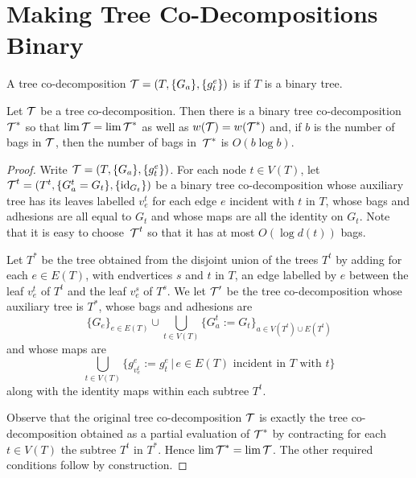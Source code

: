 
\section{Making Tree Co-Decompositions Binary}\label{appendix:binary}

\begin{definition}
    A tree co-decomposition $\operatorname{\mathcal{T}}=(T,\{G_a\},\{g_t^e\})$ is  if $T$ is a binary tree.
\end{definition}

\begin{lemma}
    Let $\operatorname{\mathcal{T}}$ be a tree co-decomposition. Then there is a binary tree co-decomposition $\operatorname{\mathcal{T}}^*$ so that $\lim \operatorname{\mathcal{T}}=\lim\operatorname{\mathcal{T}}^*$ as well as $w(\operatorname{\mathcal{T}})=w(\operatorname{\mathcal{T}}^*)$ and, if $b$ is the number of bags in $\operatorname{\mathcal{T}}$, then the number of bags in~$\operatorname{\mathcal{T}}^*$ is $O(b\log b)$.
\end{lemma}
\begin{proof}
Write $\operatorname{\mathcal{T}}=(T,\{G_a\},\{g_t^e\})$. For each node $t\in V(T)$, let $\operatorname{\mathcal{T}}^t=(T^t,\{G^t_a=G_t\},\{\text{id}_{G_t}\})$ be a binary tree co-decomposition whose auxiliary tree has its leaves labelled $v_e^t$ for each edge $e$ incident with $t$ in $T$, whose bags and adhesions are all equal to $G_t$ and whose maps are all the identity on $G_t$. Note that it is easy to choose~$\operatorname{\mathcal{T}}^t$ so that it has at most $O(\log d(t))$ bags. 

Let $T^*$ be the tree obtained from the disjoint union of the trees $T^t$ by adding for each $e\in E(T)$, with endvertices $s$ and $t$ in $T$, an edge labelled by $e$ between the leaf $v_e^t$ of $T^t$ and the leaf $v_e^s$ of $T^s$. We let $\operatorname{\mathcal{T}}'$ be the tree co-decomposition whose auxiliary tree is $T^*$, whose bags and adhesions are \[
\{G_e\}_{e\in E(T)}\cup \bigcup_{t\in V(T)}\{G^t_a:=G_t\}_{a\in V(T^t)\cup E(T^t)}\]
and whose maps are
\[
\bigcup_{t\in V(T)}\{g_{v_e^t}^e:=g_{t}^e\,|\,\text{$e\in E(T)$ incident in $T$ with $t$}\}
\]
along with the identity maps within each subtree $T^t$.

Observe that the original tree co-decomposition $\operatorname{\mathcal{T}}$ is exactly the tree co-decomposition obtained as a partial evaluation of $\operatorname{\mathcal{T}}^*$ by contracting for each $t\in V(T)$ the subtree $T^t$ in $T^*$. Hence $\lim \operatorname{\mathcal{T}}^*=\lim \operatorname{\mathcal{T}}$. The other required conditions follow by construction.
\end{proof}